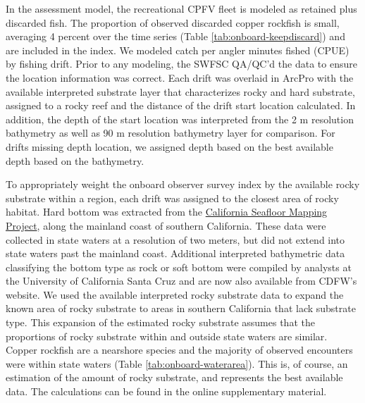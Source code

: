 \documentclass[11pt,
  english,
  letterpaper,
]{article}
\begin{document}
In the assessment model, the recreational CPFV fleet is modeled as retained plus discarded fish. The proportion of observed discarded copper rockfish is small, averaging 4 percent over the time series (Table \ref{tab:onboard-keepdiscard}) and are included in the index. We modeled catch per angler minutes fished (CPUE) by fishing drift. Prior to any modeling, the SWFSC QA/QC'd the data to ensure the location information was correct. Each drift was overlaid in ArcPro with the available interpreted substrate layer that characterizes rocky and hard substrate, assigned to a rocky reef and the distance of the drift start location calculated. In addition, the depth of the start location was interpreted from the 2 m resolution bathymetry as well as 90 m resolution bathymetry layer for comparison. For drifts missing depth location, we assigned depth based on the best available depth based on the bathymetry.

To appropriately weight the onboard observer survey index by the available rocky substrate within a region, each drift was assigned to the closest area of rocky habitat. Hard bottom was extracted from the \href{http://seafloor.otterlabs.org/index.html}{California Seafloor Mapping Project}, along the mainland coast of southern California. These data were collected in state waters at a resolution of two meters, but did not extend into state waters past the mainland coast. Additional interpreted bathymetric data classifying the bottom type as rock or soft bottom were compiled by analysts at the University of California Santa Cruz and are now also available from CDFW's website. We used the available interpreted rocky substrate data to expand the known area of rocky substrate to areas in southern California that lack substrate type. This expansion of the estimated rocky substrate assumes that the proportions of rocky substrate within and outside state waters are similar. Copper rockfish are a nearshore species and the majority of observed encounters were within state waters (Table \ref{tab:onboard-waterarea}). This is, of course, an estimation of the amount of rocky substrate, and represents the best available data. The calculations can be found in the online supplementary material.
\end{document}
